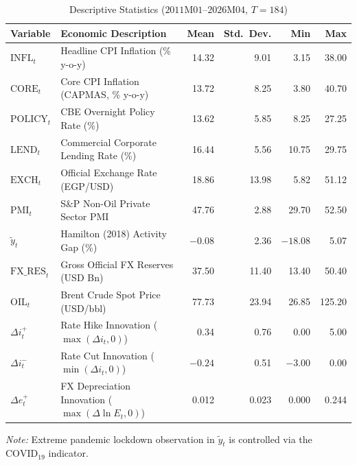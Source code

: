 \documentclass[review,12pt]{elsarticle}
\begin{document}
\begin{table}[htbp]
\centering
\small
\renewcommand{\arraystretch}{1.15}
\caption{Descriptive Statistics ($2011\text{M}01$--$2026\text{M}04$, $T=184$)}
\label{tab:descriptives}
\begin{threeparttable}
\begin{tabularx}{\textwidth}{>{\raggedright\arraybackslash}p{2.8cm} L rrrr}
\toprule
\textbf{Variable} & \textbf{Economic Description} & \textbf{Mean} & \textbf{Std.\ Dev.} & \textbf{Min} & \textbf{Max} \\
\midrule
$\text{INFL}_t$ & Headline CPI Inflation (\% y-o-y) & 14.32 & 9.01 & 3.15 & 38.00 \\
$\text{CORE}_t$ & Core CPI Inflation (CAPMAS, \% y-o-y) & 13.72 & 8.25 & 3.80 & 40.70 \\
$\text{POLICY}_t$ & CBE Overnight Policy Rate (\%) & 13.62 & 5.85 & 8.25 & 27.25 \\
$\text{LEND}_t$ & Commercial Corporate Lending Rate (\%) & 16.44 & 5.56 & 10.75 & 29.75 \\
$\text{EXCH}_t$ & Official Exchange Rate (EGP/USD) & 18.86 & 13.98 & 5.82 & 51.12 \\
$\text{PMI}_t$ & S\&P Non-Oil Private Sector PMI & 47.76 & 2.88 & 29.70 & 52.50 \\
$\tilde{y}_t$ & Hamilton (2018) Activity Gap (\%) & $-0.08$ & 2.36 & $-18.08$ & 5.07 \\
$\text{FX\_RES}_t$ & Gross Official FX Reserves (USD Bn) & 37.50 & 11.40 & 13.40 & 50.40 \\
$\text{OIL}_t$ & Brent Crude Spot Price (USD/bbl) & 77.73 & 23.94 & 26.85 & 125.20 \\
$\Delta i_t^{+}$ & Rate Hike Innovation ($\max(\Delta i_t, 0)$) & 0.34 & 0.76 & 0.00 & 5.00 \\
$\Delta i_t^{-}$ & Rate Cut Innovation ($\min(\Delta i_t, 0)$) & $-0.24$ & 0.51 & $-3.00$ & 0.00 \\
$\Delta e_t^{+}$ & FX Depreciation Innovation ($\max(\Delta \ln E_t, 0)$) & 0.012 & 0.023 & 0.000 & 0.244 \\
\bottomrule
\end{tabularx}
\begin{tablenotes}
\footnotesize
\item \textit{Note:} Extreme pandemic lockdown observation in $\tilde{y}_t$ is controlled via the $\text{COVID}_{19}$ indicator.
\end{tablenotes}
\end{threeparttable}
\end{table}
\end{document}
